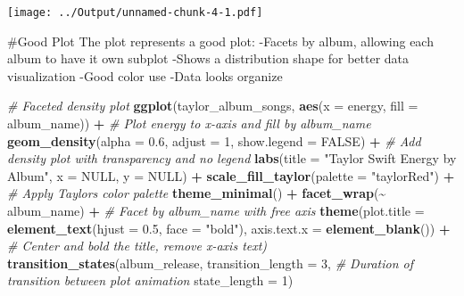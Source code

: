 \documentclass[
]{article}
\newenvironment{Shaded}{\begin{snugshade}}{\end{snugshade}}
\newcommand{\AttributeTok}[1]{\textcolor[rgb]{0.13,0.29,0.53}{#1}}
\newcommand{\CommentTok}[1]{\textcolor[rgb]{0.56,0.35,0.01}{\textit{#1}}}
\newcommand{\ConstantTok}[1]{\textcolor[rgb]{0.56,0.35,0.01}{#1}}
\newcommand{\DecValTok}[1]{\textcolor[rgb]{0.00,0.00,0.81}{#1}}
\newcommand{\FloatTok}[1]{\textcolor[rgb]{0.00,0.00,0.81}{#1}}
\newcommand{\FunctionTok}[1]{\textcolor[rgb]{0.13,0.29,0.53}{\textbf{#1}}}
\newcommand{\NormalTok}[1]{#1}
\newcommand{\SpecialCharTok}[1]{\textcolor[rgb]{0.81,0.36,0.00}{\textbf{#1}}}
\newcommand{\StringTok}[1]{\textcolor[rgb]{0.31,0.60,0.02}{#1}}
\begin{document}
\texttt{[image: ../Output/unnamed-chunk-4-1.pdf]}

\#Good Plot The plot represents a good plot: -Facets by album, allowing
each album to have it own subplot -Shows a distribution shape for better
data visualization -Good color use -Data looks organize

\begin{Shaded}
\begin{Highlighting}[]
\CommentTok{\# Faceted density plot}
\FunctionTok{ggplot}\NormalTok{(taylor\_album\_songs, }\FunctionTok{aes}\NormalTok{(}\AttributeTok{x =}\NormalTok{ energy, }
                               \AttributeTok{fill =}\NormalTok{ album\_name)) }\SpecialCharTok{+}  \CommentTok{\# Plot energy to x{-}axis and fill by album\_name}
  \FunctionTok{geom\_density}\NormalTok{(}\AttributeTok{alpha =} \FloatTok{0.6}\NormalTok{, }\AttributeTok{adjust =} \DecValTok{1}\NormalTok{, }\AttributeTok{show.legend =} \ConstantTok{FALSE}\NormalTok{) }\SpecialCharTok{+}  \CommentTok{\# Add density plot with transparency and no legend}
  \FunctionTok{labs}\NormalTok{(}\AttributeTok{title =} \StringTok{"Taylor Swift Energy by Album"}\NormalTok{,}
       \AttributeTok{x =} \ConstantTok{NULL}\NormalTok{,}
       \AttributeTok{y =} \ConstantTok{NULL}\NormalTok{) }\SpecialCharTok{+}
  \FunctionTok{scale\_fill\_taylor}\NormalTok{(}\AttributeTok{palette =} \StringTok{"taylorRed"}\NormalTok{) }\SpecialCharTok{+}  \CommentTok{\# Apply Taylor\textquotesingle{}s color palette}
  \FunctionTok{theme\_minimal}\NormalTok{() }\SpecialCharTok{+} 
  \FunctionTok{facet\_wrap}\NormalTok{(}\SpecialCharTok{\textasciitilde{}}\NormalTok{ album\_name) }\SpecialCharTok{+}  \CommentTok{\# Facet by album\_name with free axis}
  \FunctionTok{theme}\NormalTok{(}\AttributeTok{plot.title =} \FunctionTok{element\_text}\NormalTok{(}\AttributeTok{hjust =} \FloatTok{0.5}\NormalTok{, }\AttributeTok{face =} \StringTok{"bold"}\NormalTok{), }
           \AttributeTok{axis.text.x =} \FunctionTok{element\_blank}\NormalTok{()) }\SpecialCharTok{+} \CommentTok{\# Center and bold the title, remove x{-}axis text)}
  \FunctionTok{transition\_states}\NormalTok{(album\_release,}
                    \AttributeTok{transition\_length =} \DecValTok{3}\NormalTok{,  }\CommentTok{\# Duration of transition between plot animation}
                    \AttributeTok{state\_length =} \DecValTok{1}\NormalTok{) }
\end{Highlighting}
\end{Shaded}
\end{document}
